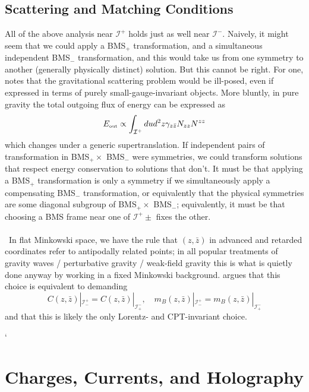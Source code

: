 \documentclass[11pt,letterpaper]{article}
\newcommand{\mc}[1]{\mathcal{#1}}
\begin{document}
\subsection{Scattering and Matching Conditions}
All of the above analysis near $\mc{I}^+$ holds just as well near $\mc{I}^-$. Naively, it might seem that we could apply a BMS$_+$ transformation, and a simultaneous independent BMS$_-$ transformation, and this would take us from one symmetry to another (generally physically distinct) solution. But this cannot be right. For one, \cite{Strominger:2017zoo} notes that the gravitational scattering problem would be ill-posed, even if expressed in terms of purely small-gauge-invariant objects. More bluntly, in pure gravity the total outgoing flux of energy can be expressed as \begin{equation}
E_{\mbox{\tiny{out}}} \propto \int_{\mc{I}^+ } du d^2 z \gamma_{z \bar{z}} N_{zz} N^{zz}
\end{equation}
which changes under a generic supertranslation. If independent pairs of transformation in BMS$_+ \times$ BMS$_-$ were symmetries, we could transform solutions that respect energy conservation to solutions that don't. It must be that applying a BMS$_+$ transformation is only a symmetry if we simultaneously apply a compensating BMS$_-$ transformation, or equivalently that the physical symmetries are some diagonal subgroup of BMS$_+ \times$ BMS$_-$; equivalently, it must be that choosing a BMS frame near one of $\mc{I}^+\pm$ fixes the other.\\
\\
\
In flat Minkowski space, we have the rule that $(z, \bar{z})$ in advanced and retarded coordinates refer to antipodally related points; in all popular treatments of gravity waves / perturbative gravity / weak-field gravity this is what is quietly done anyway by working in a fixed Minkowski background. \cite{Strominger:2013jfa} argues that this choice is equivalent to demanding \begin{equation}
C(z, \bar{z})|_{\mc{I}^+_-} = C(z, \bar{z})|_{\mc{I}^-_+}, \quad m_B(z, \bar{z})|_{\mc{I}^+_-} = m_B(z, \bar{z})|_{\mc{I}^-_+}
\end{equation}
and that this is likely the only Lorentz- and CPT-invariant choice.





`\section{Charges, Currents, and Holography}
\end{document}

